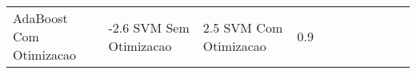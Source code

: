 \begin{table}[H]
\begin{adjustwidth}{ -1in }{ -1in }
\begin{tabular}{lllllllllll}
           AdaBoost Com Otimizacao &      -2.6%
                SVM Sem Otimizacao &       2.5%
                SVM Com Otimizacao &       0.9%
\bottomrule
\end{tabular}
    \end{adjustwidth}
    \renewcommand{\arraystretch}{1.0} %
\end{table}
